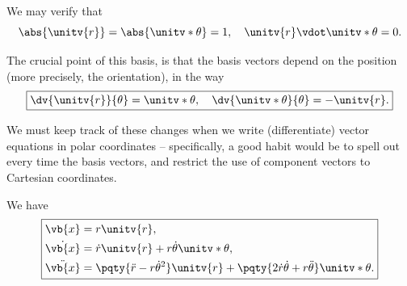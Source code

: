 We may verify that
\begin{equation}
    \abs{\unitv{r}} = \abs{\unitv*{\theta}} = 1, \quad \unitv{r} \vdot \unitv*{\theta} = 0.
\end{equation}

The crucial point of this basis, is that the basis vectors depend on the position (more precisely, the orientation), in the way
\begin{equation}
    \boxed{\dv{\unitv{r}}{\theta} = \unitv*{\theta}, \quad \dv{\unitv*{\theta}}{\theta} = - \unitv{r}.}
\end{equation}

We must keep track of these changes when we write (differentiate) vector equations in polar coordinates -- specifically, a good habit would be to spell out every time the basis vectors, and restrict the use of component vectors to Cartesian coordinates.

\begin{proposition}
    \label{prop:position-velocity-acceleration-polar}%
    We have
    \begin{equation}
        \boxed{
            \begin{aligned}
                \vb{x} &= r \unitv{r}, \\
                \dot{\vb{x}} &= \dot{r} \unitv{r} + r \dot{\theta} \unitv*{\theta}, \\
                \ddot{\vb{x}} &= \pqty{\ddot{r} - r \dot{\theta}^2} \unitv{r} + \pqty{2 \dot{r} \dot{\theta} + r \ddot{\theta}} \unitv*{\theta}.
            \end{aligned}
        }  
    \end{equation}
\end{proposition}

